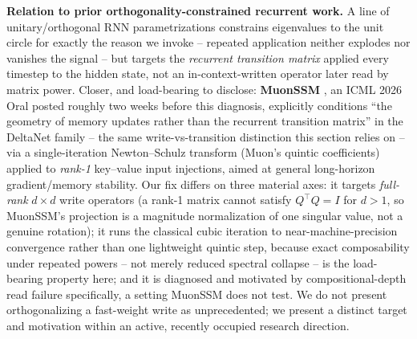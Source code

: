 \textbf{Relation to prior orthogonality-constrained recurrent work.} A
line of unitary/orthogonal RNN parametrizations
\citep{arjovsky2016unitary,helfrich2018orthogonal} constrains eigenvalues
to the unit circle for exactly the reason we invoke -- repeated
application neither explodes nor vanishes the signal -- but targets the
\emph{recurrent transition matrix} applied every timestep to the hidden
state, not an in-context-written operator later read by matrix power.
Closer, and load-bearing to disclose: \textbf{MuonSSM}
\citep{nguyen2026muonssm}, an ICML 2026 Oral posted roughly two weeks
before this diagnosis, explicitly conditions ``the geometry of memory
updates rather than the recurrent transition matrix'' in the DeltaNet
family -- the same write-vs-transition distinction this section relies on
-- via a single-iteration Newton--Schulz transform (Muon's quintic
coefficients) applied to \emph{rank-1} key--value input injections, aimed
at general long-horizon gradient/memory stability. Our fix differs on
three material axes: it targets \emph{full-rank} $d\times d$ write
operators (a rank-1 matrix cannot satisfy $Q^\top Q = I$ for $d>1$, so
MuonSSM's projection is a magnitude normalization of one singular value,
not a genuine rotation); it runs the classical cubic iteration to
near-machine-precision convergence rather than one lightweight quintic
step, because exact composability under repeated powers -- not merely
reduced spectral collapse -- is the load-bearing property here; and it is
diagnosed and motivated by compositional-depth read failure specifically,
a setting MuonSSM does not test.
We do not present orthogonalizing a fast-weight write as unprecedented;
we present a distinct target and motivation within an active, recently
occupied research direction.
